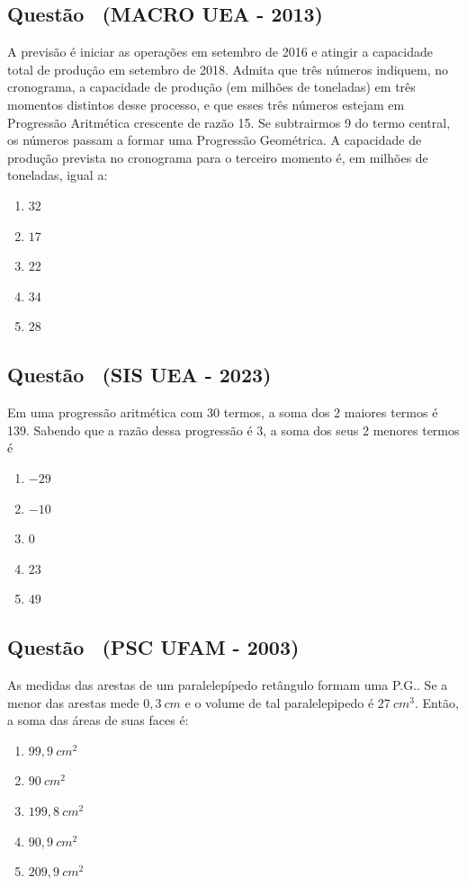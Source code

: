 \documentclass[12pt]{article}
\newcounter{questao}
\newcommand{\novaquestao}[1]{%
  \stepcounter{questao}%
  \subsection*{Questão \thequestao\ (#1)}%
}
\begin{document}
    \begin{multicols}{2}
        \columnseprule=0.4pt
        \columnsep=20pt
        
        \novaquestao{MACRO UEA - 2013}
            A previsão é iniciar as operações em setembro de 2016 e atingir a capacidade total de produção em setembro de 2018. Admita que três números indiquem, no cronograma, a capacidade de produção (em milhões de toneladas) em três momentos distintos desse processo, e que esses três números estejam em Progressão Aritmética crescente de razão 15. Se subtrairmos 9 do termo central, os números passam a formar uma Progressão Geométrica. A capacidade de produção prevista no cronograma para o terceiro momento é, em milhões de toneladas, igual a:
            
            \begin{enumerate}[label=(\alph*), noitemsep]
                \item $32$
                \item $17$
                \item $22$
                \item $34$
                \item $28$
            \end{enumerate}
        
        \novaquestao{SIS UEA - 2023}
            Em uma progressão aritmética com 30 termos, a soma dos 2 maiores termos é 139. Sabendo que a razão dessa progressão é 3, a soma dos seus 2 menores termos é
        
            \begin{enumerate}[label=(\alph*), noitemsep]
                \item $-29$
                \item $-10$
                \item $0$
                \item $23$
                \item $49$
            \end{enumerate}
        
        \novaquestao{PSC UFAM - 2003}
            As medidas das arestas de um paralelepípedo retângulo formam uma P.G.. Se a menor das arestas mede $ 0,3 \ cm$ e o volume de tal paralelepipedo é $27\ cm^{3}$. Então, a soma das áreas de suas faces é:
            
            \begin{enumerate}[label=(\alph*), noitemsep]
                \item $99,9\ cm^{2}$
                \item $90\ cm^{2}$
                \item $199,8\ cm^{2}$
                \item $90,9\ cm^{2}$
                \item $209,9\ cm^{2}$
            \end{enumerate}
        

\end{multicols}
\end{document}
